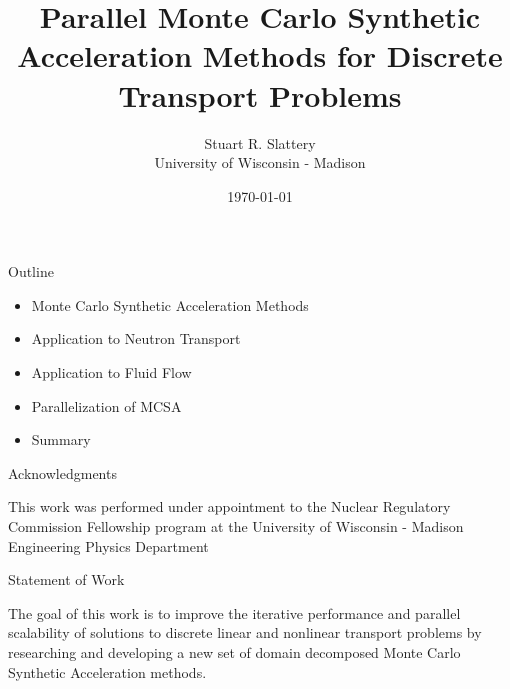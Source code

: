\documentclass{beamer}
\author{Stuart R. Slattery\\ University of Wisconsin - Madison}
\date{\today}
\title{Parallel Monte Carlo Synthetic Acceleration Methods for
  Discrete Transport Problems}
\begin{document}
\maketitle

\begin{frame}{Outline}

  \begin{itemize}
  \item Monte Carlo Synthetic Acceleration Methods
    \bigskip
  \item Application to Neutron Transport
    \bigskip
  \item Application to Fluid Flow
    \bigskip
  \item Parallelization of MCSA
    \bigskip
  \item Summary
  \end{itemize}

\end{frame}

\begin{frame}{Acknowledgments}

  This work was performed under appointment to the Nuclear Regulatory
  Commission Fellowship program at the University of Wisconsin - Madison
  Engineering Physics Department

\end{frame}

\begin{frame}{Statement of Work}

The goal of this work is to improve the iterative performance and
parallel scalability of solutions to discrete linear and nonlinear
transport problems by researching and developing a new set of domain
decomposed Monte Carlo Synthetic Acceleration methods.

\end{frame}
\end{document}
